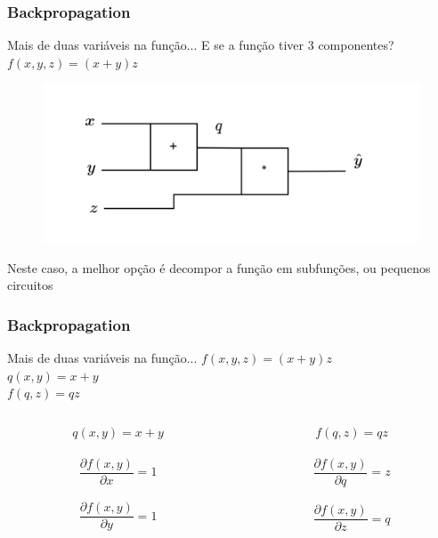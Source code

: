\documentclass{beamer}
\begin{document}
\begin{frame}
	\frametitle{Backpropagation}
	\begin{block}{Mais de duas variáveis na função...}
		E se a função tiver 3 componentes?
		$f(x,y,z) = (x+y)z$
		\begin{figure}
			\centering
			\includegraphics[width=0.7\linewidth]{figures/circuitxyz}
		\end{figure}
	Neste caso, a melhor opção é decompor a função em subfunções, ou pequenos circuitos
	\end{block}
\end{frame}
\begin{frame}
	\frametitle{Backpropagation}
	\begin{block}{Mais de duas variáveis na função...}
		$f(x,y,z) = (x+y)z$ \\
		$q(x,y) = x+y$ \\
		$f(q,z) = qz$ \\
	\end{block}
\begin{example}
	\begin{columns}
		\begin{column}{0.35\textwidth}
			$$q(x,y) = x+y$$ \\
			$$\frac{\partial f(x,y)}{\partial x} = 1$$ \\
			$$\frac{\partial f(x,y)}{\partial y} = 1$$ \\
		\end{column}
		\begin{column}{0.35\textwidth}
			$$f(q,z) = qz$$ \\
			$$\frac{\partial f(x,y)}{\partial q} = z$$ \\
			$$\frac{\partial f(x,y)}{\partial z} = q$$ \\
		\end{column}
	\end{columns}
\end{example}
\end{frame}
\end{document}
